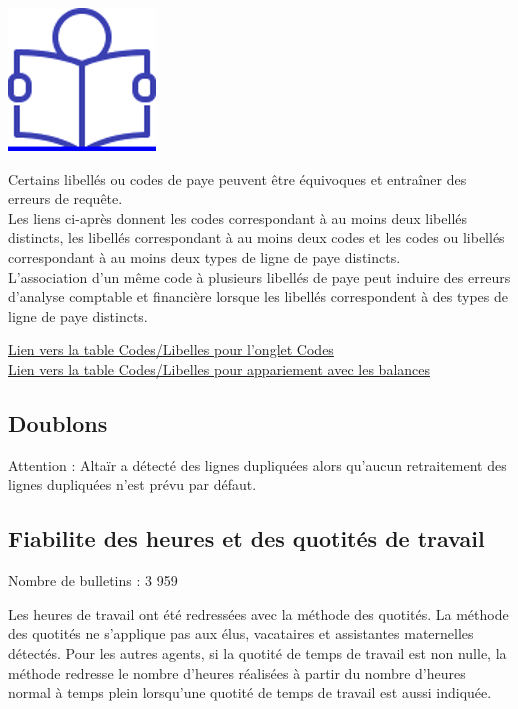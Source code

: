 \href{../Docs/Notices/fiche_individualisation.odt}{\includegraphics{icones/Notice.png}}

Certains libellés ou codes de paye peuvent être équivoques et entraîner
des erreurs de requête.\\
Les liens ci-après donnent les codes correspondant à au moins deux
libellés distincts, les libellés correspondant à au moins deux codes et
les codes ou libellés correspondant à au moins deux types de ligne de
paye distincts.\\
L'association d'un même code à plusieurs libellés de paye peut induire
des erreurs d'analyse comptable et financière lorsque les libellés
correspondent à des types de ligne de paye distincts.

\href{../Bases/Fiabilite/code.libelle.short.csv}{Lien vers la table
Codes/Libelles pour l'onglet Codes}\\
\href{../Bases/Fiabilite/code.libelle.csv}{Lien vers la table
Codes/Libelles pour appariement avec les balances}

\hypertarget{doublons}{%
\subsection{Doublons}\label{doublons}}

Attention : Altaïr a détecté des lignes dupliquées alors qu'aucun
retraitement des lignes dupliquées n'est prévu par défaut.

\hypertarget{fiabilite-des-heures-et-des-quotites-de-travail}{%
\subsection{Fiabilite des heures et des quotités de
travail}\label{fiabilite-des-heures-et-des-quotites-de-travail}}

Nombre de bulletins : 3 959

Les heures de travail ont été redressées avec la méthode des quotités.
La méthode des quotités ne s'applique pas aux élus, vacataires et
assistantes maternelles détectés. Pour les autres agents, si la quotité
de temps de travail est non nulle, la méthode redresse le nombre
d'heures réalisées à partir du nombre d'heures normal à temps plein
lorsqu'une quotité de temps de travail est aussi indiquée.

